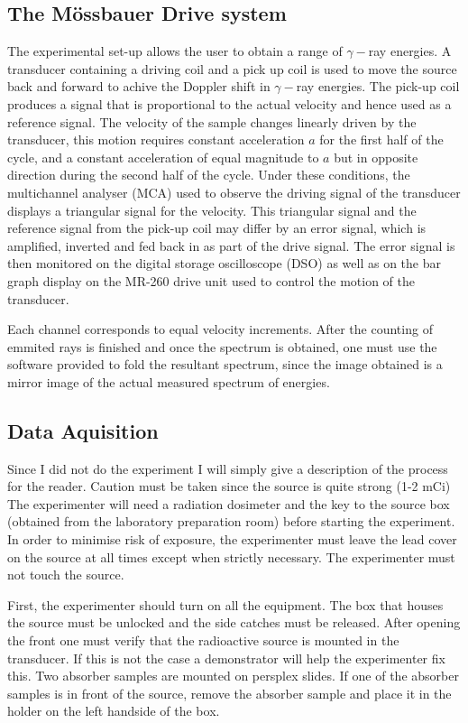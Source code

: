 \documentclass[a4paper, twocolumn]{article}
\begin{document}
\subsection{The Mössbauer Drive system}
The experimental set-up allows the user to obtain a range of $\gamma-$ray energies. A transducer containing a driving coil and a pick up coil is used to move the source back and forward to achive the Doppler shift in $\gamma-$ray energies. The pick-up coil produces a signal that is proportional to the actual velocity and hence used as a reference signal\cite{0}.
The velocity of the sample changes linearly driven by the transducer, this motion requires constant acceleration $a$ for the first half of the cycle, and a constant acceleration of equal magnitude to $a$ but in opposite direction during the second half of the cycle\cite{0}.
Under these conditions, the multichannel analyser (MCA) used to observe the driving signal of the transducer displays a triangular signal for the velocity. 
This triangular signal and the reference signal from the pick-up coil may differ by an error signal, which is amplified, inverted and fed back in as part of the drive signal. The error signal is then monitored on the digital storage oscilloscope (DSO) as well as on the bar graph display on the MR-260 drive unit used to control the motion of the transducer\cite{0}.

Each channel corresponds to equal velocity increments\cite{0}. After the counting of emmited rays is finished and once the spectrum is obtained, one must use the software provided to fold the resultant spectrum, since the image obtained is a mirror image of the actual measured spectrum of energies\cite{0}.

\subsection{Data Aquisition}
Since I did not do the experiment I will simply give a description of the process for the reader.
Caution must be taken since the source is quite strong (1-2 mCi) The experimenter will need a radiation dosimeter and the key to the source box (obtained from the laboratory preparation room) before starting the experiment\cite{0}.
In order to minimise risk of exposure, the experimenter must leave the lead cover on the source at all times except when strictly necessary.
The experimenter must not touch the source.

First, the experimenter should turn on all the equipment. The box that houses the source must be unlocked and the side catches must be released. After opening the front one must verify that the radioactive source is mounted in the transducer. If this is not the case a demonstrator will help the experimenter fix this. Two absorber samples are mounted on persplex slides. If one of the absorber samples is in front of the source, remove the absorber sample and place it in the holder on the left handside of the box.
\end{document}
